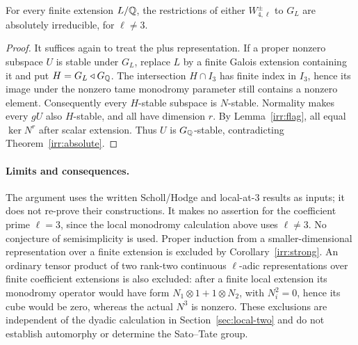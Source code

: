\begin{corollary}\label{irr:strong}
For every finite extension $L/\mathbb Q$, the restrictions of either
$W_{4,\ell}^\pm$ to $G_L$ are absolutely irreducible, for $\ell\ne3$.
\end{corollary}
\begin{proof}
It suffices again to treat the plus representation. If a proper nonzero
subspace $U$ is stable under $G_L$, replace $L$ by a finite Galois
extension containing it and put $H=G_L\triangleleft G_\mathbb Q$.
The intersection $H\cap I_3$ has finite index in $I_3$, hence its image
under the nonzero tame monodromy parameter still contains a nonzero
element. Consequently every $H$-stable subspace is $N$-stable.
Normality makes every $gU$ also $H$-stable, and all have dimension $r$.
By Lemma~\ref{irr:flag}, all equal $\ker N^r$ after scalar extension.
Thus $U$ is $G_\mathbb Q$-stable, contradicting Theorem~\ref{irr:absolute}.
\end{proof}

\paragraph{Limits and consequences.}
The argument uses the written Scholl/Hodge and local-at-$3$ results as
inputs; it does not re-prove their constructions. It makes no assertion
for the coefficient prime $\ell=3$, since the local monodromy calculation
above uses $\ell\ne3$. No conjecture of semisimplicity is used.
Proper induction from a smaller-dimensional representation over a finite
extension is excluded by Corollary~\ref{irr:strong}. An ordinary tensor
product of two rank-two continuous $\ell$-adic representations over finite
coefficient extensions is also excluded:
after a finite local extension its monodromy operator would have form
$N_1\otimes1+1\otimes N_2$, with $N_i^2=0$, hence its cube would be
zero, whereas the actual $N^3$ is nonzero. These exclusions are independent
of the dyadic calculation in Section~\ref{sec:local-two} and do not
establish automorphy or determine the Sato--Tate group.

